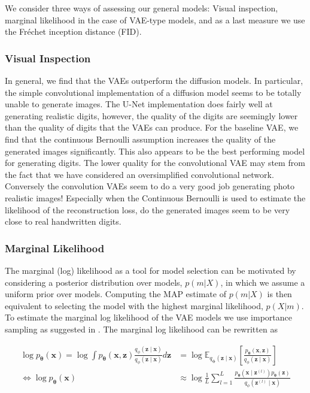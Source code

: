 We consider three ways of assessing our general models: Visual inspection, marginal likelihood in the case of VAE-type models, and as a last measure we use the Fréchet inception distance (FID). 

\subsubsection*{Visual Inspection}

In general, we find that the VAEs outperform the diffusion models. In particular, the simple convolutional implementation of a diffusion model seems to be totally unable to generate images. The U-Net implementation does fairly well at generating realistic digits, however, the quality of the digits are seemingly lower than the quality of digits that the VAEs can produce. For the baseline VAE, we find that the continuous Bernoulli assumption increases the quality of the generated images significantly. This also appears to be the best performing model for generating digits. The lower quality for the convolutional VAE may stem from the fact that we have considered an oversimplified convolutional network. Conversely the convolution VAEs seem to do a very good job generating photo realistic images! Especially when the Continuous Bernoulli is used to estimate the likelihood of the reconstruction loss, do the generated images seem to be very close to real handwritten digits. 

\subsubsection*{Marginal Likelihood}
The marginal (log) likelihood as a tool for model selection can be motivated by considering a posterior distribution over models, $p(m|X)$, in which we assume a uniform prior over models. Computing the MAP estimate of $p(m|X)$ is then equivalent to selecting the model with the highest marginal likelihood, $p(X|m)$. To estimate the marginal log likelihood of the VAE models we use importance sampling as suggested in \cite{importancesampling}. The marginal log likelihood can be rewritten as

\begin{align}
	\nonumber
	\log p_{\bm{\theta}}(\mathbf{x}) = \log \int p_{\bm{\theta}}(\mathbf{x}, \mathbf{z})
	\frac{q_{\phi}(\mathbf{z} \mid \mathbf{x})}{q_{\phi}(\mathbf{z} \mid \mathbf{x})}
	d \mathbf{z}                                                                                      
	                                 & =
	\nonumber
	\log \mathbb{E}_{q_{\bm{\phi}}(\mathbf{z} \mid  \mathbf{x})} \left[
		\frac{
			p_{\bm{\theta}}(\mathbf{x}, \mathbf{z})
		}{q_{\phi}(\mathbf{z} \mid \mathbf{x})}
	\right]                                                                                             \\
	\label{IS-VAE}
	\Leftrightarrow
	\log p_{\bm{\theta}}(\mathbf{x}) & \approx
	\log \frac{1}{L} \sum_{l=1}^{L}
	\frac{
		p_{\bm{\theta}}(\mathbf{x} \mid  \mathbf{z}^{(l)}) p_{\bm{\theta}}(\mathbf{z})
	}{
		q_{\phi}(\mathbf{z}^{(l)} \mid \mathbf{x})
	}
\end{align}

